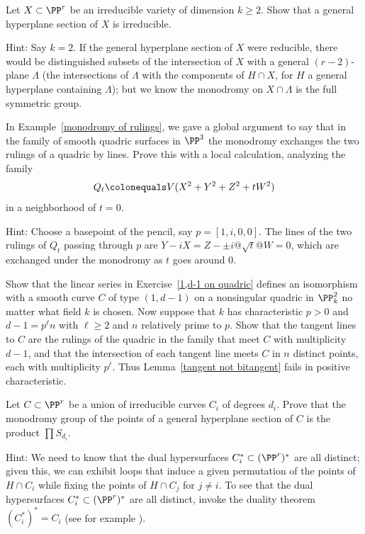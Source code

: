 \begin{exercise}
Let $X \subset \PP^r$ be an irreducible variety of dimension $k \geq
2$. Show that a general hyperplane section of $X$ is irreducible.

Hint: Say $k=2$. If the general hyperplane section of $X$ were reducible,
there would be distinguished subsets of the intersection of $X$ with
a general $(r-2)$-plane $\Lambda$ (the intersections of $\Lambda$ with
the components of $H \cap X$, for $H$ a general hyperplane containing
$\Lambda$); but we know the monodromy on $X \cap \Lambda$ is the full
symmetric group.
\end{exercise}

\begin{exercise}
In Example~\ref{monodromy of rulings}, we gave a global argument to say
that in the family of smooth quadric surfaces in $\PP^3$ the monodromy
exchanges the two rulings of a quadric by lines. Prove this with a local
calculation, analyzing the family
$$
Q_t \colonequals  V(X^2+Y^2+Z^2 + tW^2)
$$
in a neighborhood of $t=0$.

Hint: Choose a basepoint of the pencil, say $p = [1, i, 0, 0]$. The
lines of the two rulings of $Q_t$ passing through $p$ are
$Y-iX = Z-\pm i@\sqrt{t}@W = 0$, which are exchanged under the monodromy
as $t$ goes around 0.
\end{exercise}

\begin{exercise}
\label{kaji}
Show that the linear series 
in Exercise~\ref{1,d-1 on quadric}
%
defines an isomorphism with a smooth curve $C$ of type $(1, d-1)$ on a
nonsingular quadric in $\PP^2_k$ no matter what field $k$ is chosen. Now
suppose that  $k$ has characteristic $p>0$ and $d-1 = p^\ell n$ with
$\ell\ge 2$
and $n$ relatively prime to $p$.
Show that the tangent lines to $C$ are the rulings of the quadric in the
family that meet $C$ with multiplicity $d-1$, and that the intersection of
each tangent line meets $C$ in $n$ distinct points, each with multiplicity
$p^\ell$. Thus Lemma~\ref{tangent not bitangent}
fails in 
positive characteristic. 
% 
\end{exercise}

\begin{exercise}
Let $C \subset \PP^r$ be a union of irreducible curves $C_i$ of degrees
$d_i$. Prove that the monodromy group of the points of a general
hyperplane section of $C$ is the product $\prod S_{d_i}$.

Hint: We need to know that the dual hypersurfaces $C_i^* \subset
(\PP^r)^*$ are all distinct; given this, we can exhibit loops that induce
a given permutation of the points of $H \cap C_i$ while fixing the points
of $H \cap C_j$ for $j \neq i$. To see that the dual hypersurfaces $C_i^*
\subset (\PP^r)^*$ are all distinct, invoke the duality theorem $(C_i^*)^*
= C_i$ (see for example \cite{3264}).
\end{exercise}

